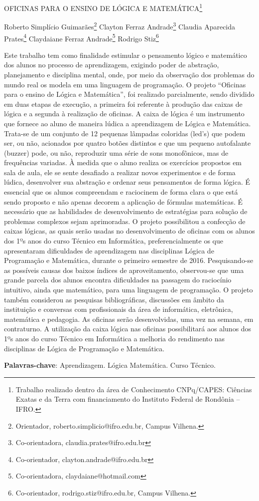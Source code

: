 \documentclass[article,12pt,onesidea,4paper,english,brazil]{abntex2}
\begin{document}
	
	
	\frenchspacing 
	
	\begin{center}
		\LARGE OFICINAS PARA O ENSINO DE LÓGICA E MATEMÁTICA\footnote{Trabalho realizado dentro da área de Conhecimento CNPq/CAPES: Ciências Exatas e da Terra com financiamento do Instituto Federal de Rondônia – IFRO.}
		
		\normalsize
		Roberto Simplício Guimarães\footnote{Orientador, roberto.simplicio@ifro.edu.br, Campus Vilhena.} 
		Clayton Ferraz Andrade\footnote{Co-orientadora, claudia.prates@ifro.edu.br} 
		Claudia Aparecida Prates\footnote{Co-orientador, clayton.andrade@ifro.edu.br} 
		Claydaiane Ferraz Andrade\footnote{Co-orientadora, claydaiane@hotmail.com}
		Rodrigo Stiz\footnote{Co-orientador, rodrigo.stiz@ifro.edu.br, Campus Vilhena.} 
	\end{center}
	
	\noindent Este trabalho tem como finalidade estimular o pensamento lógico e matemático dos alunos no processo de aprendizagem, exigindo poder de abstração, planejamento e disciplina mental, onde, por meio da observação dos problemas do mundo real  os modela em uma linguagem de programação. O projeto “Oficinas para o ensino de Lógica e Matemática”, foi realizado parcialmente, sendo  dividido em duas etapas de execução, a primeira foi referente à produção  das caixas de lógica e a segunda à realização de oficinas.   A caixa de lógica é um instrumento que fornece ao aluno de maneira lúdica a aprendizagem de Lógica e Matemática. Trata-se de um conjunto de 12 pequenas lâmpadas coloridas (led’s) que podem ser, ou não, acionados por quatro botões distintos e que um pequeno autofalante (buzzer) pode, ou não, reproduzir uma série de sons monofônicos, mas de frequências variadas. À medida que o aluno realiza os exercícios propostos em sala de aula, ele se sente desafiado a realizar novos experimentos e de forma lúdica, desenvolver sua abstração e ordenar seus pensamentos de forma lógica. É essencial que os alunos compreendam e raciocinem de forma clara o que está sendo proposto e não apenas decorem a aplicação de fórmulas matemáticas. É necessário que as habilidades de desenvolvimento de estratégias para solução de problemas complexos sejam aprimoradas. O projeto possibilitou a confecção de caixas lógicas, as quais serão usadas no desenvolvimento de oficinas com os alunos dos 1ºs anos do curso Técnico em Informática, preferencialmente os que apresentaram dificuldades de aprendizagem nas disciplinas Lógica de Programação e Matemática, durante o primeiro semestre de 2016. Pesquisando-se as possíveis causas dos baixos índices de aproveitamento, observou-se que uma grande parcela dos alunos encontra dificuldades na passagem do raciocínio intuitivo, ainda que matemático, para uma linguagem de programação. O projeto também considerou as pesquisas bibliográficas, discussões em âmbito da instituição e conversas com profissionais da área de informática, eletrônica, matemática e pedagogia.  As oficinas serão desenvolvidas, uma vez na semana, em contraturno.  A utilização da caixa lógica  nas oficinas possibilitará  aos alunos dos 1ºs anos do curso Técnico em Informática a melhoria do rendimento nas disciplinas  de Lógica de Programação e Matemática.
	
	\vspace{\onelineskip}
	
	\noindent
	\textbf{Palavras-chave}: Aprendizagem. Lógica Matemática. Curso Técnico.
	
\end{document}
